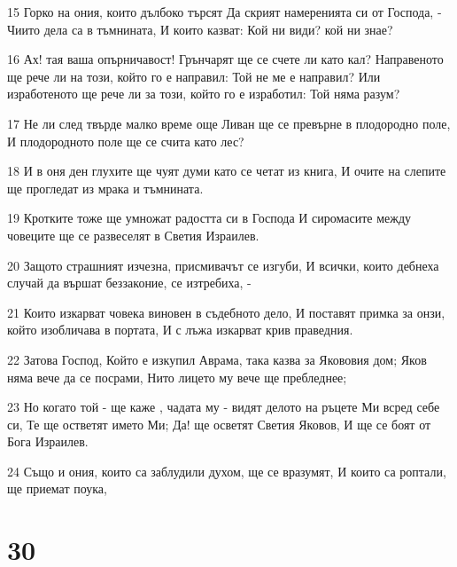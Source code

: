 \par 15 Горко на ония, които дълбоко търсят Да скрият намеренията си от Господа, - Чиито дела са в тъмнината, И които казват: Кой ни види? кой ни знае?
\par 16 Ах! тая ваша опърничавост! Грънчарят ще се счете ли като кал? Направеното ще рече ли на този, който го е направил: Той не ме е направил? Или изработеното ще рече ли за този, който го е изработил: Той няма разум?
\par 17 Не ли след твърде малко време още Ливан ще се превърне в плодородно поле, И плодородното поле ще се счита като лес?
\par 18 И в оня ден глухите ще чуят думи като се четат из книга, И очите на слепите ще прогледат из мрака и тъмнината.
\par 19 Кротките тоже ще умножат радостта си в Господа И сиромасите между човеците ще се развеселят в Светия Израилев.
\par 20 Защото страшният изчезна, присмивачът се изгуби, И всички, които дебнеха случай да вършат беззаконие, се изтребиха, -
\par 21 Които изкарват човека виновен в съдебното дело, И поставят примка за онзи, който изобличава в портата, И с лъжа изкарват крив праведния.
\par 22 Затова Господ, Който е изкупил Аврама, така казва за Якововия дом; Яков няма вече да се посрами, Нито лицето му вече ще пребледнее;
\par 23 Но когато той - ще каже , чадата му - видят делото на ръцете Ми всред себе си, Те ще остветят името Ми; Да! ще осветят Светия Яковов, И ще се боят от Бога Израилев.
\par 24 Също и ония, които са заблудили духом, ще се вразумят, И които са роптали, ще приемат поука,

\chapter{30}


